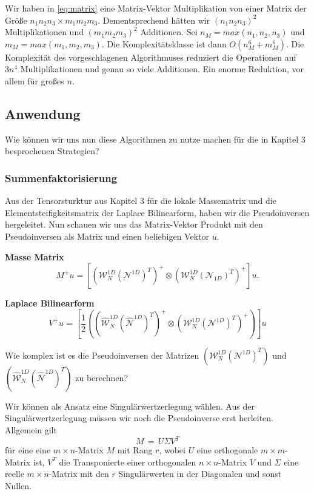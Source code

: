  
Wir haben in \ref{eq:matrix} eine Matrix-Vektor Multiplikation von einer Matrix der Größe $n_1 n_2 n_3 \times m_1 m_2 m_3$. Dementsprechend hätten wir $(n_1 n_2 n_3)^{2}$ Multiplikationen und $(m_1 m_2 m_3)^{2}$ Additionen. Sei $n_M = max(n_1,n_2,n_3)$ und $m_M=max(m_1,m_2,m_3)$. Die Komplexitätsklasse ist dann $O(n_M^6+m_M^6)$. Die Komplexität des vorgeschlagenen Algorithmuses reduziert die Operationen auf $3n^{4}$ Multiplikationen und genau so viele Additionen.
Ein enorme Reduktion, vor allem für großes $n$.
\newline

\newpage
\subsection{Anwendung}

Wie können wir uns nun diese Algorithmen zu nutze machen für die in Kapitel 3 besprochenen Strategien?

\subsubsection{Summenfaktorisierung}

Aus der Tensorsturktur aus Kapitel 3 für die lokale Massematrix und die Elementsteifigkeitsmatrix der Laplace Bilinearform, haben wir die Pseudoinversen hergeleitet. Nun schauen wir uns das Matrix-Vektor Produkt mit den Pseudoinversen als Matrix und einen beliebigen Vektor $u$.


\textbf{Masse Matrix} 
\begin{equation*}
M^{+}u =  [(\mathcal{W}_N^{1D} (\mathcal{N}^{1D})^T)^+ \otimes (\mathcal{W}_N^{1D} (\mathcal{N}_{1D})^T)^+]u.
\end{equation*}

\textbf{Laplace Bilinearform}
\begin{equation*}
V^{+}u =  [\dfrac{1}{2} ((\widehat{\mathcal{W}}_N^{1D} (\widehat{\mathcal{N}}^{1D})^T)^+ \otimes (\mathcal{W}_N^{1D} (\mathcal{N}^{1D})^T)^+)]u
\end{equation*}

Wie komplex ist es die Pseudoinversen der Matrizen $(\mathcal{W}_N^{1D} (\mathcal{N}^{1D})^T)$ und $(\widehat{\mathcal{W}}_N^{1D} (\widehat{\mathcal{N}}^{1D})^T)$ zu berechnen?

Wir können als Ansatz eine Singulärwertzerlegung wählen. Aus der Singulärwertzerlegung müssen wir noch die Pseudoinverse erst herleiten.
Allgemein gilt
\begin{equation*}
M\,=\,U\Sigma V^{T}
\end{equation*}
für eine eine $m \times n$-Matrix $M$ mit Rang $r$, wobei
$U$ eine orthogonale $m\times m$-Matrix ist, $V^{T}$ die Transponierte einer orthogonalen $n\times n$-Matrix $V$ und
$\Sigma$  eine reelle  $m\times n$-Matrix mit den $r$ Singulärwerten in der Diagonalen und sonst Nullen.

